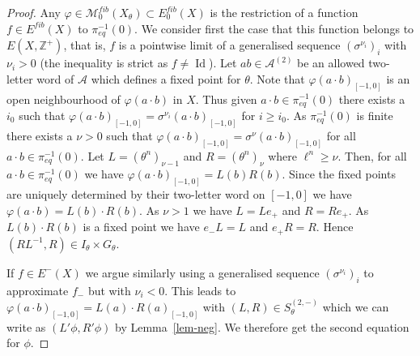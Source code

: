 \documentclass[12pt]{amsart}
\theoremstyle{definition}
\numberwithin{equation}{section}
\newcommand{\Z}{\mathbb Z}
\DeclareMathOperator{\Id}{Id}
\newcommand{\Aa}{{\mathcal A}}
\newcommand{\pe}{\pi_{eq}}
\newcommand{\M}{\mathcal M}
\newcommand{\Ef}{E^{fib}}
\newcommand{\Sfib}{\M^{fib}_0(X_\theta)}
\begin{document}
\begin{proof} Any $\varphi\in \Sfib\subset \Ef_0(X)$ is the restriction of a function $f\in \Ef(X)$ to $\pe^{-1}(0)$. We consider first the case that this function belongs to $E(X,\Z^+)$,
that is, $f$ is a pointwise limit of a generalised sequence $(\sigma^{\nu_i})_i$ with $\nu_i> 0$ (the inequality is strict as $f\neq \Id$). Let $ab\in \mathcal A^{(2)}$ be an allowed two-letter word of $\Aa$ which defines a fixed point for $\theta$.  Note that $\varphi(a\cdot b)_{[-1,0]}$ is an open neighbourhood of $\varphi(a\cdot b)$ in $X$. Thus given $a\cdot b\in\pe^{-1}(0)$ there exists a 
$i_0$ such that $\varphi(a\cdot b)_{[-1,0]} = \sigma^{\nu_i}(a\cdot b)_{[-1,0]}$ for $i\geq i_0$. As $\pe^{-1}(0)$ is finite there exists a 
$\nu>0$ such that $\varphi(a\cdot b)_{[-1,0]} = \sigma^{\nu}(a\cdot b)_{[-1,0]}$  for all $a\cdot b\in\pe^{-1}(0)$. Let 
 $L=(\theta^n)_{\nu-1}$ and $R=(\theta^n)_{\nu}$ where $\ell^n\geq \nu$. Then, for all  $a\cdot b\in\pe^{-1}(0)$ we have $\varphi(a\cdot b)_{[-1,0]} = 
L(b) R(b)$. Since the fixed points are uniquely determined by their two-letter word on $[-1,0]$ we have $\varphi(a\cdot b) = L(b) \cdot R(b)$. 
As $\nu>1$ we have $L = Le_+$ and $R=R e_+$. As $L(b) \cdot R(b)$ is a fixed point we have $e_-L=L$ and $e_+R = R$. Hence $(RL^{-1},R)\in I_\theta\times G_\theta$. 


If $f \in E^-(X)$ we argue similarly using a generalised sequence $(\sigma^{\nu_i})_i$ to approximate $f_-$ but with $\nu_i<0$.  
This leads to  $\varphi(a\cdot b)_{[-1,0]} = L(a)\cdot R(a)_{[-1,0]}$ with $(L,R)\in S^{(2,-)}_\theta$ which we can write as $(L'\phi,R'\phi)$ by Lemma~\ref{lem-neg}. We therefore get the second equation for $\phi$.
\end{proof}


\end{document}

